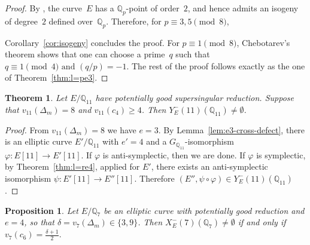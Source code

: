 \documentclass[12pt]{amsart}
\numberwithin{equation}{section}
\newtheorem{theorem}[equation]{Theorem}
\newtheorem{proposition}[equation]{Proposition}
\theoremstyle{definition}
\newcommand{\Q}{\mathbb{Q}}
\begin{document}
\begin{proof}
By \cite[Lemma~19~(i)]{symplectic}, the curve~$E$ has a $\Q_p$-point of
order~$2$, and hence admits an isogeny of
degree~$2$ defined over~$\Q_p$. Therefore, for
$p\equiv3,5\pmod8$, 

Corollary~\ref{cor:isogeny} concludes the proof.
For $p\equiv1\pmod8$, Chebotarev's theorem shows that one
can choose a prime~$q$ such that
\(
    q\equiv1\pmod4
    \text{ and }
    ({q}/{p})=-1.
\)
The rest of the proof follows exactly as the one of Theorem~\ref{thm:l=pe3}.
\end{proof}

\begin{theorem}\label{thm:l=p=11e=3}
Let $E/\Q_{11}$ have potentially good
supersingular reduction. Suppose that $v_{11}(\Delta_m)=8$ and  $v_{11}(c_4)\geq4$. Then $Y_E^-(11)(\Q_{11})\ne \emptyset$.
\end{theorem}
\begin{proof} From $v_{11}(\Delta_m)=8$ we have $e=3$.
    By Lemma~\ref{lem:e3-cross-defect}, there is an elliptic curve $E'/\Q_{11}$ with $e'=4$ and a $G_{\Q_{11}}$-isomorphism $\varphi:E[11]\to E'[11]$. If $\varphi$ is anti-symplectic, then we are done. If $\varphi$ is symplectic, by Theorem~\ref{thm:l=re4}, applied for $E'$, there exists an anti-symplectic isomorphism $\psi:E'[11]\to E''[11]$. Therefore $(E'',\psi \circ\varphi) \in Y_E^-(11)(\Q_{11})$.
\end{proof}

\begin{proposition}\label{prop:prime7defect4}
Let $E/\Q_7$ be an elliptic curve with potentially good reduction 
and $e=4$, so that $\delta=v_7(\Delta_m)\in\{3,9\}$.   
Then $X_E^-(7)(\Q_7)\ne\emptyset$ if and only if $v_7(c_6)=\frac{\delta+1}{2}.$
\end{proposition}
\end{document}
